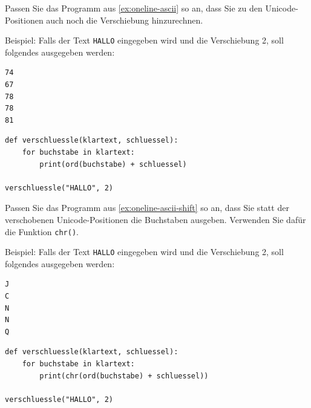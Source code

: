 \begin{myexercise}\label{ex:oneline-ascii-shift}
    Passen Sie das Programm aus \cref{ex:oneline-ascii} so an, dass Sie zu den Unicode-Positionen auch noch die Verschiebung hinzurechnen.

    Beispiel: Falls der Text \texttt{HALLO} eingegeben wird und die Verschiebung 2, soll folgendes ausgegeben werden:
    \begin{lstlisting}[language=bash]
74
67
78
78
81
\end{lstlisting}
    \begin{myanswer}
        \begin{lstlisting}
def verschluessle(klartext, schluessel):
    for buchstabe in klartext:
        print(ord(buchstabe) + schluessel)

verschluessle("HALLO", 2)
\end{lstlisting}
    \end{myanswer}
\end{myexercise}

\begin{myexercise}\label{ex:oneline-ascii-shift-char}
    Passen Sie das Programm aus \cref{ex:oneline-ascii-shift} so an, dass Sie statt der verschobenen Unicode-Positionen die Buchstaben ausgeben. Verwenden Sie dafür die Funktion \lstinline|chr()|.


    Beispiel: Falls der Text \texttt{HALLO} eingegeben wird und die Verschiebung 2, soll folgendes ausgegeben werden:
    \begin{lstlisting}[language=bash]
J
C
N
N
Q
\end{lstlisting}
    \begin{myanswer}
        \begin{lstlisting}
def verschluessle(klartext, schluessel):
    for buchstabe in klartext:
        print(chr(ord(buchstabe) + schluessel))

verschluessle("HALLO", 2)
\end{lstlisting}
    \end{myanswer}
\end{myexercise}

